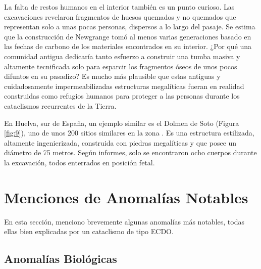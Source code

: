\documentclass[10pt,twocolumn,letterpaper]{article}
\begin{document}
La falta de restos humanos en el interior también es un punto curioso. Las excavaciones revelaron fragmentos de huesos quemados y no quemados que representan solo a unas pocas personas, dispersos a lo largo del pasaje. Se estima que la construcción de Newgrange tomó al menos varias generaciones basado en las fechas de carbono de los materiales encontrados en su interior. ¿Por qué una comunidad antigua dedicaría tanto esfuerzo a construir una tumba masiva y altamente tecnificada solo para esparcir los fragmentos óseos de unos pocos difuntos en su pasadizo? Es mucho más plausible que estas antiguas y cuidadosamente impermeabilizadas estructuras megalíticas fueran en realidad construidas como refugios humanos para proteger a las personas durante los cataclismos recurrentes de la Tierra.

En Huelva, sur de España, un ejemplo similar es el Dolmen de Soto (Figura \ref{fig:9}), uno de unos 200 sitios similares en la zona \cite{72,32}. Es una estructura estilizada, altamente ingenierizada, construida con piedras megalíticas y que posee un diámetro de 75 metros. Según informes, solo se encontraron ocho cuerpos durante la excavación, todos enterrados en posición fetal.

\section{Menciones de Anomalías Notables}

En esta sección, menciono brevemente algunas anomalías más notables, todas ellas bien explicadas por un cataclismo de tipo ECDO.

\subsection{Anomalías Biológicas}
\end{document}
